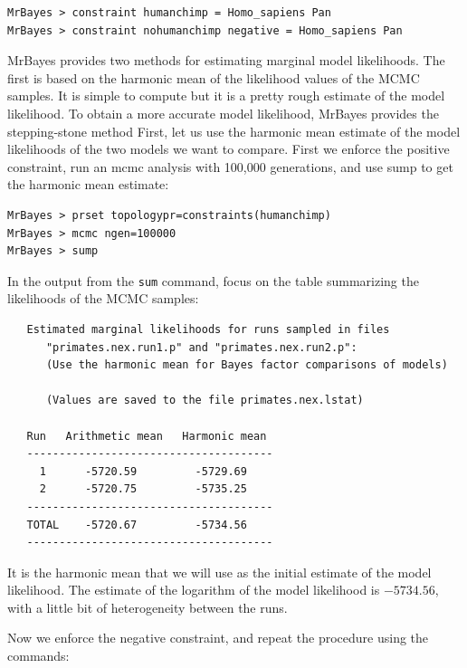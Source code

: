 \documentclass[12pt]{book}
\newcommand{\ttt}[1]{\texttt{#1} }
\begin{document}
\begin{verbatim}
MrBayes > constraint humanchimp = Homo_sapiens Pan
MrBayes > constraint nohumanchimp negative = Homo_sapiens Pan
\end{verbatim}

MrBayes provides two methods for estimating marginal model likelihoods. The first is based on the harmonic mean of
the likelihood values of the MCMC samples. It is simple to compute but it is a pretty rough estimate of the model
likelihood. To obtain a more accurate model likelihood, MrBayes provides the stepping-stone method First, let us use the harmonic mean estimate of the model likelihoods of the two models we want to compare. First we enforce the positive constraint, run an mcmc analysis with 100,000 generations, and use sump to get the harmonic mean estimate:

\begin{singlespacing}
\begin{verbatim}
MrBayes > prset topologypr=constraints(humanchimp)
MrBayes > mcmc ngen=100000
MrBayes > sump
\end{verbatim}
\end{singlespacing}

In the output from the \ttt{sum} command, focus on the table summarizing the likelihoods of the MCMC samples:

\begin{singlespacing}
\begin{verbatim}
   Estimated marginal likelihoods for runs sampled in files
      "primates.nex.run1.p" and "primates.nex.run2.p":
      (Use the harmonic mean for Bayes factor comparisons of models)

      (Values are saved to the file primates.nex.lstat)

   Run   Arithmetic mean   Harmonic mean
   --------------------------------------
     1      -5720.59         -5729.69
     2      -5720.75         -5735.25
   --------------------------------------
   TOTAL    -5720.67         -5734.56
   --------------------------------------
\end{verbatim}
\end{singlespacing}

It is the harmonic mean that we will use as the initial estimate of the model likelihood. The estimate of the logarithm
of the model likelihood is $-5734.56$, with a little bit of heterogeneity between the runs.

Now we enforce the negative constraint, and repeat the procedure using the commands:
\end{document}
